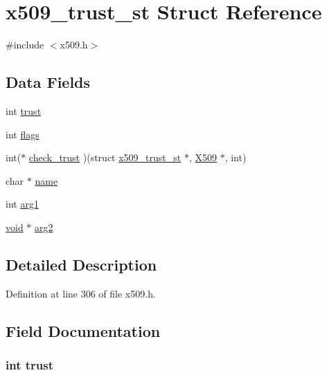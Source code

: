 \hypertarget{structx509__trust__st}{}\section{x509\+\_\+trust\+\_\+st Struct Reference}
\label{structx509__trust__st}


{\ttfamily \#include $<$x509.\+h$>$}

\subsection*{Data Fields}
\begin{DoxyCompactItemize}
\item 
int \hyperlink{structx509__trust__st_afd5c82d38ea055842dd3ab04fd2e316e}{trust}
\item 
int \hyperlink{structx509__trust__st_ac8bf36fe0577cba66bccda3a6f7e80a4}{flags}
\item 
int($\ast$ \hyperlink{structx509__trust__st_a62b245258f7c59c65e6d42bb0aaa9daf}{check\+\_\+trust} )(struct \hyperlink{structx509__trust__st}{x509\+\_\+trust\+\_\+st} $\ast$, \hyperlink{crypto_2ossl__typ_8h_a4f666bde6518f95deb3050c54b408416}{X509} $\ast$, int)
\item 
char $\ast$ \hyperlink{structx509__trust__st_ad547fb8186b526cb1b588daad4334fbe}{name}
\item 
int \hyperlink{structx509__trust__st_a7c04804f84b92c51293bd83351e2c9cc}{arg1}
\item 
\hyperlink{hw__4758__cca_8h_afad4d591c7931ff6dc5bf69c76c96aa0}{void} $\ast$ \hyperlink{structx509__trust__st_a018e28f301c79a4512596db6ead532f3}{arg2}
\end{DoxyCompactItemize}


\subsection{Detailed Description}


Definition at line 306 of file x509.\+h.



\subsection{Field Documentation}
\subsubsection[{\texorpdfstring{trust}{trust}}]{\setlength{\rightskip}{0pt plus 5cm}int trust}\hypertarget{structx509__trust__st_afd5c82d38ea055842dd3ab04fd2e316e}{}\label{structx509__trust__st_afd5c82d38ea055842dd3ab04fd2e316e}


